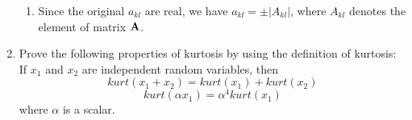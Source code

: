 \begin{enumerate}
\begin{solution}
\begin{enumerate}
    \item Since the original $a_{kl}$ are real, we have $a_{kl} = \pm
      |A_{kl}|$, where $A_{kl}$ denotes the element of matrix $\bf{A}$.
    \end{enumerate}
  \end{solution}

  
\item Prove the following properties of kurtosis by using the definition of kurtosis:
  If $x_1$ and $x_2$ are independent random variables, then
  \begin{displaymath}
    kurt(x_1 + x_2) = kurt(x_1) + kurt(x_2)
  \end{displaymath}
  \begin{displaymath}
    kurt(\alpha x_1) = \alpha^4 kurt(x_1)
  \end{displaymath}
  where $\alpha$ is a scalar.
  
  \begin{solution}


\end{solution}
\end{enumerate}
